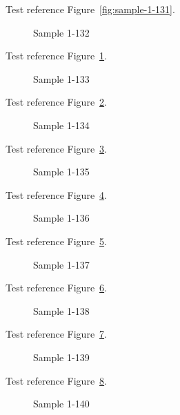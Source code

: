 Test reference Figure~\ref{fig:sample-1-131}.

\begin{figure}[tbhp]
\caption{Sample 1-132}
\label{fig:sample-1-132}
\end{figure}

Test reference Figure~\ref{fig:sample-1-132}.

\begin{figure}[tbhp]
\caption{Sample 1-133}
\label{fig:sample-1-133}
\end{figure}

Test reference Figure~\ref{fig:sample-1-133}.

\begin{figure}[tbhp]
\caption{Sample 1-134}
\label{fig:sample-1-134}
\end{figure}

Test reference Figure~\ref{fig:sample-1-134}.

\begin{figure}[tbhp]
\caption{Sample 1-135}
\label{fig:sample-1-135}
\end{figure}

Test reference Figure~\ref{fig:sample-1-135}.

\begin{figure}[tbhp]
\caption{Sample 1-136}
\label{fig:sample-1-136}
\end{figure}

Test reference Figure~\ref{fig:sample-1-136}.

\begin{figure}[tbhp]
\caption{Sample 1-137}
\label{fig:sample-1-137}
\end{figure}

Test reference Figure~\ref{fig:sample-1-137}.

\begin{figure}[tbhp]
\caption{Sample 1-138}
\label{fig:sample-1-138}
\end{figure}

Test reference Figure~\ref{fig:sample-1-138}.

\begin{figure}[tbhp]
\caption{Sample 1-139}
\label{fig:sample-1-139}
\end{figure}

Test reference Figure~\ref{fig:sample-1-139}.

\begin{figure}[tbhp]
\caption{Sample 1-140}
\label{fig:sample-1-140}
\end{figure}

